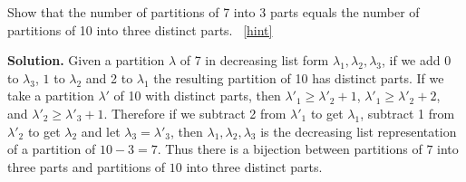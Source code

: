 \documentclass{book}
\begin{document}
\setcounter{project}{311}
\addtocounter{project}{-1}
\begin{activity}[]\label{activity-304}
\hypertarget{p-1594}{}%
Show that the number of partitions of 7 into 3 parts equals the number of partitions of 10 into three distinct parts.%
~\hfill{\tiny\hyperlink{a-311}{[hint]}\hypertarget{q-311}{}}\par\smallskip%
\noindent\textbf{Solution.}\hypertarget{solution-230}{}\quad%
\hypertarget{p-1596}{}%
Given a partition \(\lambda\) of 7 in decreasing list form \(\lambda_1,\lambda_2,\lambda_3\), if we add 0 to \(\lambda_3\), \(1\) to \(\lambda_2\) and 2 to \(\lambda_1\) the resulting partition of 10 has distinct parts. If we take a partition \(\lambda'\) of 10 with distinct parts, then \(\lambda'_1\ge\lambda'_2+1\), \(\lambda'_1\ge\lambda'_2+2\), and \(\lambda'_2\ge \lambda'_3+1\). Therefore if we subtract 2 from \(\lambda'_1\) to get \(\lambda_1\), subtract 1 from \(\lambda'_2\) to get \(\lambda_2\) and let \(\lambda_3= \lambda'_3\), then \(\lambda_1,\lambda_2,\lambda_3\) is the decreasing list representation of a partition of \(10-3=7\). Thus there is a bijection between partitions of \(7\) into three parts and partitions of \(10\) into three distinct parts.%
\end{activity}
\end{document}
